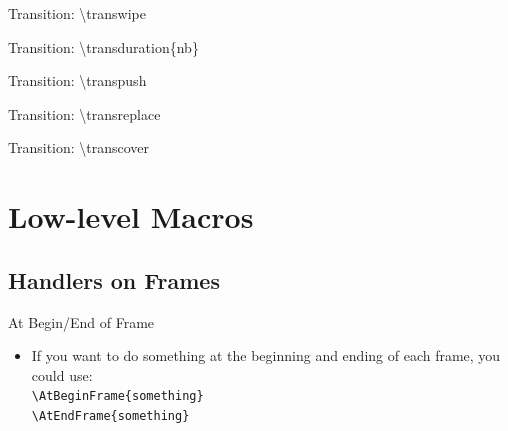 \documentclass[english,sectioncirclenumberstyle]{ciadbeamer}
\begin{document}
\begin{frame}[c]{Transition: {\textbackslash}transwipe}
	\transwipe
	\begin{center}
	\end{center}
\end{frame}

\begin{frame}[c]{Transition: {\textbackslash}transduration\{nb\}}
	\begin{center}
	\end{center}
\end{frame}

\begin{frame}[c]{Transition: {\textbackslash}transpush}
	\transpush
	\begin{center}
	\end{center}
\end{frame}

\begin{frame}[c]{Transition: {\textbackslash}transreplace}
	\transreplace
	\begin{center}
	\end{center}
\end{frame}

\begin{frame}[c]{Transition: {\textbackslash}transcover}
	\transcover
	\begin{center}
	\end{center}
\end{frame}



\section{Low-level Macros}
\tableofcontentslide[sectionstyle={show/shaded},subsectionstyle={show/show/hide},subsubsectionstyle={hide/hide/hide/hide},sections={3-}]

\subsection{Handlers on Frames}

\begin{frame}{At Begin/End of Frame}
	\begin{itemize}
	\item If you want to do something at the beginning and ending of each frame, you could use: \\
		\texttt{{\textbackslash}AtBeginFrame\{something\}} \\
		\texttt{{\textbackslash}AtEndFrame\{something\}}
	\end{itemize}
\end{frame}
\end{document}
